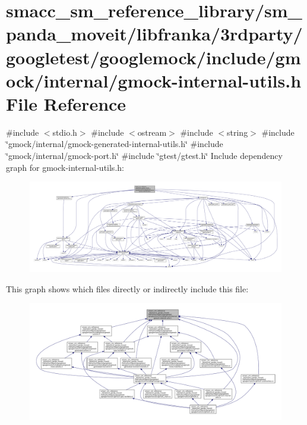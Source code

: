 \hypertarget{gmock-internal-utils_8h}{}\section{smacc\+\_\+sm\+\_\+reference\+\_\+library/sm\+\_\+panda\+\_\+moveit/libfranka/3rdparty/googletest/googlemock/include/gmock/internal/gmock-\/internal-\/utils.h File Reference}
\label{gmock-internal-utils_8h}
{\ttfamily \#include $<$stdio.\+h$>$}\newline
{\ttfamily \#include $<$ostream$>$}\newline
{\ttfamily \#include $<$string$>$}\newline
{\ttfamily \#include \char`\"{}gmock/internal/gmock-\/generated-\/internal-\/utils.\+h\char`\"{}}\newline
{\ttfamily \#include \char`\"{}gmock/internal/gmock-\/port.\+h\char`\"{}}\newline
{\ttfamily \#include \char`\"{}gtest/gtest.\+h\char`\"{}}\newline
Include dependency graph for gmock-\/internal-\/utils.h\+:
\nopagebreak
\begin{figure}[H]
\begin{center}
\leavevmode
\includegraphics[width=350pt]{gmock-internal-utils_8h__incl}
\end{center}
\end{figure}
This graph shows which files directly or indirectly include this file\+:
\nopagebreak
\begin{figure}[H]
\begin{center}
\leavevmode
\includegraphics[width=350pt]{gmock-internal-utils_8h__dep__incl}
\end{center}
\end{figure}
